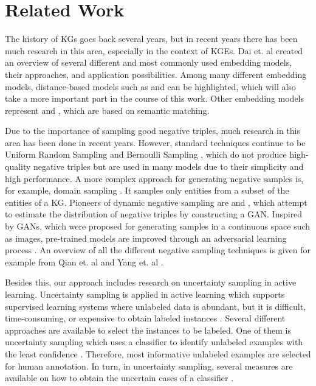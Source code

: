 \section{Related Work} 
\label{sec:relatedwork}

The history of \acp{KG} goes back several years, but in recent years there has been much research in this area, especially in the context of \acp{KGE}.  
Dai et. al \cite{electronics9050750} created an overview of several different and most commonly used embedding models, their approaches, and application possibilities.
Among many different embedding models, distance-based models such as \transe \cite{TransE} and \transd \cite{TransD} can be highlighted, which will also take a more important part in the course of this work.
Other embedding models represent \distmult \cite{DistMult} and \complex \cite{ComplEx}, which are based on semantic matching. 

Due to the importance of sampling good negative triples, much research in this area has been done in recent years.
However, standard techniques continue to be Uniform Random Sampling \cite{TransE} and Bernoulli Sampling \cite{TransH}, which do not produce high-quality negative triples but are used in many models due to their simplicity and high performance.  
A more complex approach for generating negative samples is, for example, domain sampling \cite{domainSampling}.
It samples only entities from a subset of the entities of a \ac{KG}.
Pioneers of dynamic negative sampling are \kbgan \cite{cai2017kbgan} and \igan \cite{IGAN}, which attempt to estimate the distribution of negative triples by constructing a \ac{GAN}.
Inspired by \acp{GAN}, which were proposed for generating samples in a continuous space such as images, pre-trained models are improved through an adversarial learning process \cite{cai2017kbgan}.
An overview of all the different negative sampling techniques is given for example from Qian et. al \cite{qiannegative} and Yang et. al \cite{MCNS}.

Besides this, our approach includes research on uncertainty sampling in active learning.
Uncertainty sampling is applied in active learning which supports supervised learning systems where unlabeled data is abundant, but it is difficult, time-consuming, or expensive to obtain labeled instances \cite{Settles2009ActiveLL}.
Several different approaches are available to select the instances to be labeled.
One of them is uncertainty sampling which uses a classifier to identify unlabeled examples with the least confidence \cite{5272205}.
Therefore, most informative unlabeled examples are selected for human annotation.
In turn, in uncertainty sampling, several measures are available on how to obtain the uncertain cases of a classifier \cite{nguyen2021howtomeasure}.